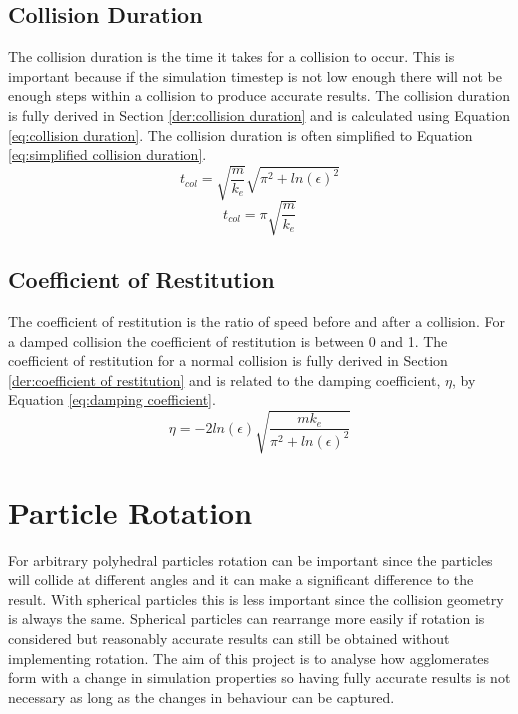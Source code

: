 \documentclass[a4paper,11pt,titlepage]{report}
\begin{document}
\subsection{Collision Duration}
\label{sec:collision duration}
The collision duration is the time it takes for a collision to occur. This is important because if the simulation timestep is not low enough there will not be enough steps within a collision to produce accurate results. The collision duration is fully derived in Section \ref{der:collision duration} and is calculated using Equation \ref{eq:collision duration}. The collision duration is often simplified to Equation \ref{eq:simplified collision duration}\cite{tuley}.
\begin{equation}
t_{col} = \sqrt{\dfrac{m}{k_e}}\sqrt{\pi^2 + ln(\epsilon)^2}
\label{eq:collision duration}
\end{equation}
\begin{equation}
t_{col} = \pi \sqrt{\dfrac{m}{k_e}}
\label{eq:simplified collision duration}
\end{equation}
\subsection{Coefficient of Restitution}
The coefficient of restitution is the ratio of speed before and after a collision. For a damped collision the coefficient of restitution is between 0 and 1. The coefficient of restitution for a normal collision is fully derived in Section \ref{der:coefficient of restitution} and is related to the damping coefficient, $\eta$, by Equation \ref{eq:damping coefficient}.
\begin{equation}
\eta = - 2 ln(\epsilon) \sqrt{\dfrac{m k_e}{\pi^2 + ln(\epsilon)^2}}
\label{eq:damping coefficient}
\end{equation}
\section{Particle Rotation}
For arbitrary polyhedral particles rotation can be important since the particles will collide at different angles and it can make a significant difference to the result. With spherical particles this is less important since the collision geometry is always the same. Spherical particles can rearrange more easily if rotation is considered but reasonably accurate results can still be obtained without implementing rotation. The aim of this project is to analyse how agglomerates form with a change in simulation properties so having fully accurate results is not necessary as long as the changes in behaviour can be captured.
\end{document}
